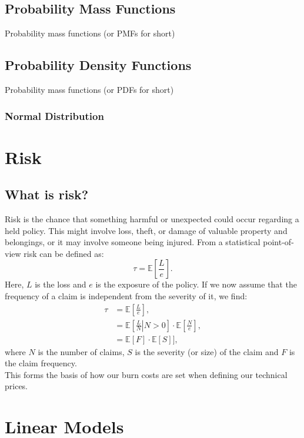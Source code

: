 \documentclass{article}
\begin{document}
\subsection{Probability Mass Functions}
Probability mass functions (or PMFs for short)

\subsection{Probability Density Functions}
Probability mass functions (or PDFs for short)



\subsubsection{Normal Distribution}



\section{Risk}
\subsection{What is risk?}
Risk is the chance that something harmful or unexpected could occur regarding a held policy. This might involve loss, theft, or damage of valuable property and belongings, or it may involve someone being injured. From a statistical point-of-view risk can be defined as:
\begin{equation}
    \tau = \mathbb{E}\left[\frac{L}{e}\right].
\end{equation}
Here, $L$ is the loss and $e$ is the exposure of the policy. If we now assume that the frequency of a claim is independent from the severity of it, we find:
\begin{align}
    \tau &= \mathbb{E}\left[\frac{L}{e}\right], \\
    &= \mathbb{E}\left[\left.\frac{L}{N}\right\vert N>0\right]\cdot\mathbb{E}\left[\frac{N}{e}\right], \\
    &= \mathbb{E}[F]\cdot\mathbb{E}[S]],
\end{align}
where $N$ is the number of claims, $S$ is the severity (or size) of the claim and $F$ is the claim frequency.\\
This forms the basis of how our burn costs are set when defining our technical prices.

\section{Linear Models}
\end{document}
